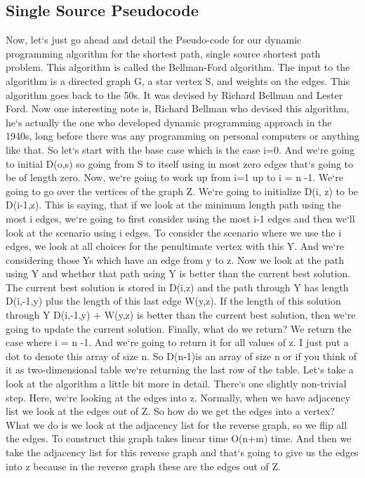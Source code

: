 \subsection{Single Source  Pseudocode}
Now, let`s just go ahead and detail the Pseudo-code for our dynamic programming algorithm for the shortest path, single source shortest path problem.
This algorithm is called the Bellman-Ford algorithm.
The input to the algorithm is a directed graph G, a star vertex S, and weights on the edges.
This algorithm goes back to the 50s.
It was devised by Richard Bellman and Lester Ford.
Now one interesting note is, Richard Bellman who devised this algorithm, he`s actually the one who developed dynamic programming approach in the 1940s, long before there was any programming on personal computers or anything like that.
So let`s start with the base case which is the case i=0.
And we`re going to initial D(o,s) so going from S to itself using in most zero edges that`s going to be of length zero.
Now, we`re going to work up from i=1 up to i = n -1.
We`re going to go over the vertices of the graph Z\@.
We`re going to initialize D(i, z) to be D(i-1,z).
This is saying, that if we look at the minimum length path using the most i edges, we`re going to first consider using the most i-1 edges and then we`ll look at the scenario using i edges.
To consider the scenario where we use the i edges, we look at all choices for the penultimate vertex with this Y\@.
And we`re considering those Ys which have an edge from y to z.
Now we look at the path using Y and whether that path using Y is better than the current best solution.
The current best solution is stored in D(i,z) and the path through Y has length D(i,-1,y) plus the length of this last edge W(y,z).
If the length of this solution through Y D(i,-1,y) + W(y,z) is better than the current best solution, then we`re going to update the current solution.
Finally, what do we return? We return the case where i = n -1.
And we`re going to return it for all values of z.
I just put a dot to denote this array of size n.
So D(n-1)is an array of size n or if you think of it as two-dimensional table we`re returning the last row of the table.
Let`s take a look at the algorithm a little bit more in detail.
There`s one slightly non-trivial step.
Here, we`re looking at the edges into z.
Normally, when we have adjacency list we look at the edges out of Z\@.
So how do we get the edges into a vertex? What we do is we look at the adjacency list for the reverse graph, so we flip all the edges.
To construct this graph takes linear time O(n+m) time.
And then we take the adjacency list for this reverse graph and that`s going to give us the edges into z because in the reverse graph these are the edges out of Z\@.
